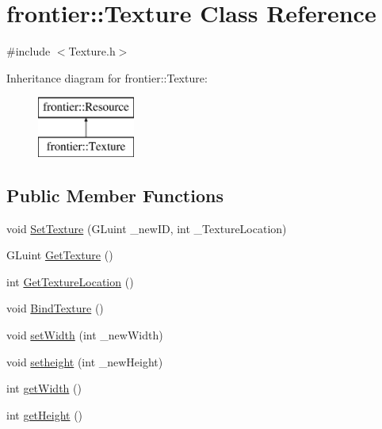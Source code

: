 \hypertarget{classfrontier_1_1_texture}{}\section{frontier\+:\+:Texture Class Reference}
\label{classfrontier_1_1_texture}


{\ttfamily \#include $<$Texture.\+h$>$}

Inheritance diagram for frontier\+:\+:Texture\+:\begin{figure}[H]
\begin{center}
\leavevmode
\includegraphics[height=2.000000cm]{classfrontier_1_1_texture}
\end{center}
\end{figure}
\subsection*{Public Member Functions}
\begin{DoxyCompactItemize}
\item 
void \hyperlink{classfrontier_1_1_texture_aebcb88a76b11179ba97d70d9ee6d2a9b}{Set\+Texture} (G\+Luint \+\_\+new\+ID, int \+\_\+\+Texture\+Location)
\item 
G\+Luint \hyperlink{classfrontier_1_1_texture_ac6ca90a251f23a0fcbcf56ae7b3bb544}{Get\+Texture} ()
\item 
int \hyperlink{classfrontier_1_1_texture_a93935a9af5c67d31eaf7c8074dbb13c5}{Get\+Texture\+Location} ()
\item 
void \hyperlink{classfrontier_1_1_texture_ae983ce4ddd78a5170e3beed65b17ae3f}{Bind\+Texture} ()
\item 
void \hyperlink{classfrontier_1_1_texture_a6e9f3458f2379c2c1da8ef37fff44e23}{set\+Width} (int \+\_\+new\+Width)
\item 
void \hyperlink{classfrontier_1_1_texture_af320a9ab95483f8ee0257822b8808ddf}{setheight} (int \+\_\+new\+Height)
\item 
int \hyperlink{classfrontier_1_1_texture_aeb2dceaecb487189632085bdb25798cf}{get\+Width} ()
\item 
int \hyperlink{classfrontier_1_1_texture_a06409c7da8be6d613514baaac1ff11bc}{get\+Height} ()
\end{DoxyCompactItemize}
